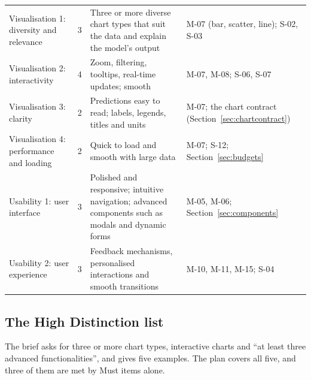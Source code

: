 {\begin{longtable}{@{}L{3.3cm}C{0.7cm}L{5.6cm}L{4.4cm}@{}}
Visualisation 1: diversity and relevance & 3 & Three or more diverse chart types that suit the data and explain the model's output & M-07 (bar, scatter, line); S-02, S-03 \\
Visualisation 2: interactivity & 4 & Zoom, filtering, tooltips, real-time updates; smooth & M-07, M-08; S-06, S-07 \\
Visualisation 3: clarity & 2 & Predictions easy to read; labels, legends, titles and units & M-07; the chart contract (Section~\ref{sec:chartcontract}) \\
Visualisation 4: performance and loading & 2 & Quick to load and smooth with large data & M-07; S-12; Section~\ref{sec:budgets} \\
Usability 1: user interface & 3 & Polished and responsive; intuitive navigation; advanced components such as modals and dynamic forms & M-05, M-06; Section~\ref{sec:components} \\
Usability 2: user experience & 3 & Feedback mechanisms, personalised interactions and smooth transitions & M-10, M-11, M-15; S-04 \\
\bottomrule
\end{longtable}
}

\subsection{The High Distinction list}
\label{sec:hdmap}

The brief asks for three or more chart types, interactive charts and ``at least three advanced
functionalities'', and gives five examples. The plan covers all five, and three of them are met by
Must items alone.

